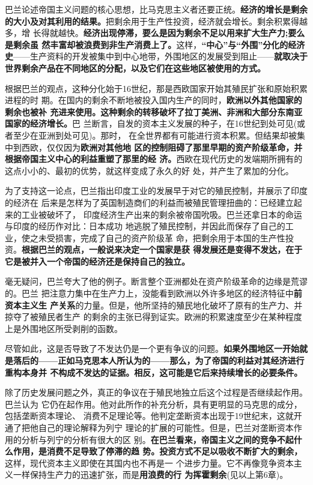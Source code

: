 巴兰论述帝国主义问题的核心思想，比马克思主义者还要正统。\textbf{经济的增长是剩余
  的大小及对其利用的结果。}把剩余用于生产性投资，经济就会增长。剩余积累得越多，增
长得就越快。\textbf{经济出现停滞，要么是因为剩余不足以用来扩大生产力;要么是剩余虽
  然丰富却被浪费到非生产消费上了。}这样，\textbf{“中心”与“外围”分化的经济
  史}——生产资料的开发被集中到中心地带，外围地区的发展受到阻止——\textbf{就取决于
  世界剩余产品在不同地区的分配，以及它们在这些地区被使用的方式。}

根据巴兰的观点，这种分化始于16世纪，那是西欧国家开始其殖民扩张和原始积累进程的时
期。在国内的剩余不断地被投入国内生产的同时，\textbf{欧洲以外其他国家的剩余也被补
  充进来使用。这种剩余的转移破坏了拉丁美洲、非洲和大部分东南亚国家的经济增长。}巴
兰断言，自发的资本主义发展的种子，在16世纪到处可见(或者至少在亚洲到处可见)。那时，
在全世界都有可能进行资本积累。但结果却被集中到西欧，仅仅因为\textbf{欧洲对其他地
  区的控制阻碍了那里早期的资产阶级革命，并根据帝国主义中心的利益重塑了那里的经
  济。}西欧在现代历史的发端期所拥有的这点小小的、最初的优势，就这样变成了永久的好
处，并产生了累加的分化。

为了支持这一论点，巴兰指出印度工业的发展早于对它的殖民控制，并展示了印度的经济在
后来是怎样为了英国制造商们的利益而被殖民管理扭曲的：已经建立起来的工业被破坏了，
印度经济生产出来的剩余被帝国吮吸。巴兰还拿日本的命运与印度的经历作对比：日本成功
地逃脱了殖民控制，并因此而保存了自己的工业，使之未受损害，完成了自己的资产阶级革
命，把剩余用于本国的生产性投资。\textbf{根据巴兰的观点，一般说来决定一个国家是获
  得发展还是变得不发达，在于它是被并入一个帝国的经济还是保持自己的独立。}

毫无疑问，巴兰夸大了他的例子。断言整个亚洲都处在资产阶级革命的边缘是荒谬的。巴兰
把注意力集中在生产力上，没能看到欧洲以外许多地区的经济特征中\textbf{前资本主义生
  产关系}的力量。但是，他所坚持的殖民地化破坏了原有的生产力、并掠夺了被殖民者生产
的剩余的主张已得到证实。欧洲的积累速度至少在某种程度上是外围地区所受剥削的函数。

尽管如此，这是否导致了不发达仍是一个更有争议的问题。\textbf{如果外围地区一开始就
  是落后的——正如马克思本人所认为的——那么，为了帝国的利益对其经济进行重构本身并
  不构成不发达的证据。相反，这可能是它后来持续增长的必要条件。}

除了历史发展问题之外，真正的争议在于殖民地独立后这个过程是否继续起作用。巴兰认为
它仍在起作用。他对此所作的补充分析，具有更明显的马克思的成分，包括垄断资本理论、
消费不足理论等。他判定垄断资本出现于19世纪末，这就开通了把他自己的理论解释为列宁
理论的扩展的可能性。但是，巴兰对垄断资本作用的分析与列宁的分析有很大的区
别。\textbf{在巴兰看来，帝国主义之间的竞争不起什么作用，是消费不足导致了停滞的趋
  势。投资方式不足以吸收不断扩大的剩余，}这样，现代资本主义即使在其国内也不再是一
个进步力量。它不再像竞争资本主义一样保持生产力的迅速扩张，而是\textbf{用浪费的行
  为挥霍剩余}(见以上第6章)。

